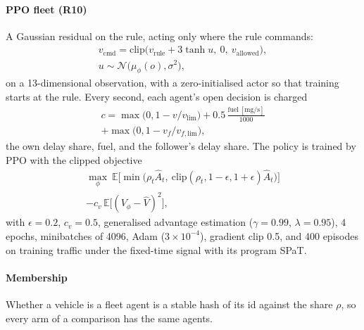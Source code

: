 \paragraph{PPO fleet (R10)} A Gaussian residual on the rule, acting only where the rule commands:
\begin{gather}
v_{\mathrm{cmd}}=\mathrm{clip}\big(v_{\mathrm{rule}}+3\tanh u,\ 0,\ v_{\mathrm{allowed}}\big),\\
u\sim\mathcal N\big(\mu_\phi(o),\sigma^2\big),
\end{gather}
on a 13-dimensional observation, with a zero-initialised actor so that training starts at the rule. Every second, each agent's open
decision is charged
\begin{multline}
c=\max\big(0,1-v/v_{\mathrm{lim}}\big)+0.5\,\frac{\text{fuel}\,[\mathrm{mg/s}]}{1000}\\+\max\big(0,1-v_f/v_{f,\mathrm{lim}}\big),
\end{multline}
the own delay share, fuel, and the follower's delay share. The policy is trained by PPO with the clipped objective
\begin{multline}
\max_\phi\ \mathbb E\Big[\min\big(\rho_t\hat A_t,\ \mathrm{clip}(\rho_t,1-\epsilon,1+\epsilon)\hat A_t\big)\Big]\\-c_v\,\mathbb E\big[(V_\phi-\hat V)^2\big],
\end{multline}
with $\epsilon=0.2$, $c_v=0.5$, generalised advantage estimation ($\gamma=0.99$, $\lambda=0.95$), 4 epochs, minibatches of 4096, Adam
($3\times10^{-4}$), gradient clip 0.5, and 400 episodes on training traffic under the fixed-time signal with its program SPaT.
\paragraph{Membership} Whether a vehicle is a fleet agent is a stable hash of its id against the share $\rho$, so every arm of a
comparison has the same agents.

